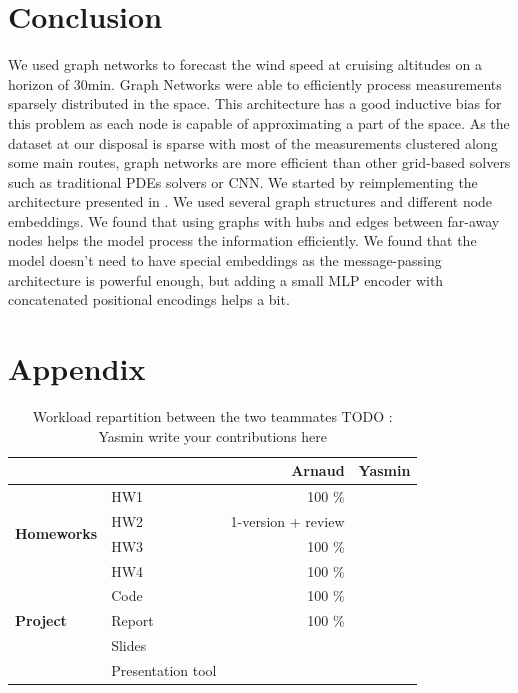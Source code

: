 \documentclass[a4paper,10pt]{article}
\begin{document}
\section{Conclusion}
We used graph networks to forecast the wind speed at cruising altitudes on a horizon of 30min. Graph Networks were able to efficiently process measurements sparsely distributed in the space. This architecture has a good inductive bias for this problem as each node is capable of approximating a part of the space. As the dataset at our disposal is sparse with most of the measurements clustered along some main routes, graph networks are more efficient than other grid-based solvers such as traditional PDEs solvers or CNN. We started by reimplementing the architecture presented in \cite{alet2019gen}. We used several graph structures and different node embeddings. We found that using graphs with hubs and edges between far-away nodes helps the model process the information efficiently. We found that the model doesn't need to have special embeddings as the message-passing architecture is powerful enough, but adding a small MLP encoder with concatenated positional encodings helps a bit.




\section{Appendix}
\FloatBarrier
\begin{table}
  \centering
  \begin{tabular}{llrr} \toprule
                                        &                   & \textbf{Arnaud}    & \textbf{Yasmin} \\ \midrule
    \multirow{4}{*}{\textbf{Homeworks}} & HW1               & 100 \%             &                 \\
                                        & HW2               & 1-version + review &                 \\
                                        & HW3               & 100 \%             &                 \\
                                        & HW4               & 100 \%             &                 \\ \cmidrule{2-4}
    \multirow{3}{*}{\textbf{Project}}   & Code              & 100 \%             &                 \\
                                        & Report            & 100 \%             &                 \\
                                        & Slides            &                    &                 \\
                                        & Presentation tool &                    &                 \\
    \bottomrule
  \end{tabular}
  \caption{ Workload repartition between the two teammates \color{red} TODO : Yasmin write your contributions here}
  \label{tab:nodes}
\end{table}
\end{document}
